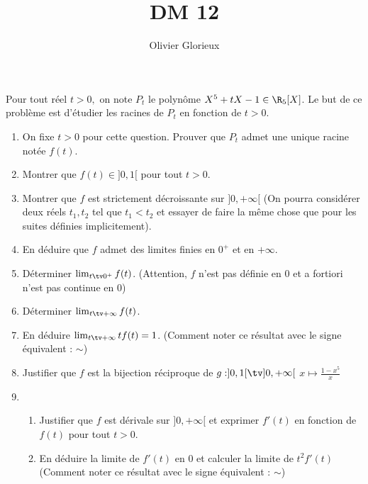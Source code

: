 \documentclass[a4paper, 11pt,reqno]{article}
\author{Olivier Glorieux}
\begin{document}
\title{DM 12}



\begin{exercice}
Pour tout réel $t>0, $ on note $P_t$ le polynôme $X^5 +tX-1 \in \R_5[X]$. Le but de ce problème est d'étudier les racines de $P_t$ en fonction de $t>0$. 
\begin{enumerate}
\item On fixe $t>0$ pour cette question. Prouver que $P_t$ admet une unique racine notée $f(t)$. 
\item Montrer que $f(t) \in ]0,1[$ pour tout $t>0.$
\item Montrer que $f$ est strictement décroissante sur $]0,+\infty[$ (On pourra considérer deux réels $t_1,t_2$ tel que $t_1<t_2$ et essayer de faire la même chose que pour les suites définies implicitement).
\item En déduire que $f$ admet des limites finies en $0^+$ et en $+\infty$.

\item Déterminer $\lim_{t\tv 0^+} f(t)$.  (Attention, $f $ n'est pas définie en $0$ et a fortiori n'est pas continue en $0$)

\item Déterminer $\lim_{t\tv+\infty} f(t)$. 
\item En déduire  $\lim_{t\tv +\infty} tf(t)= 1$. (Comment noter ce résultat avec le signe équivalent : $\sim$) 

\item Justifier que $f$ est la bijection réciproque de $g : ]0,1[\tv ]0,+\infty[$ 
$x \mapsto\frac{1-x^5}{x}$
\item \begin{enumerate}
\item Justifier que $f$ est dérivale sur $]0,+\infty[ $ et exprimer $f'(t)$ en fonction de $f(t)$ pour tout $t>0$.
\item En déduire la limite de $f'(t)$ en $0$ et calculer la limite de $t^2 f'(t)$ (Comment noter ce résultat avec le signe équivalent : $\sim$) 
\end{enumerate}
\end{enumerate}
\end{exercice}
\end{document}
